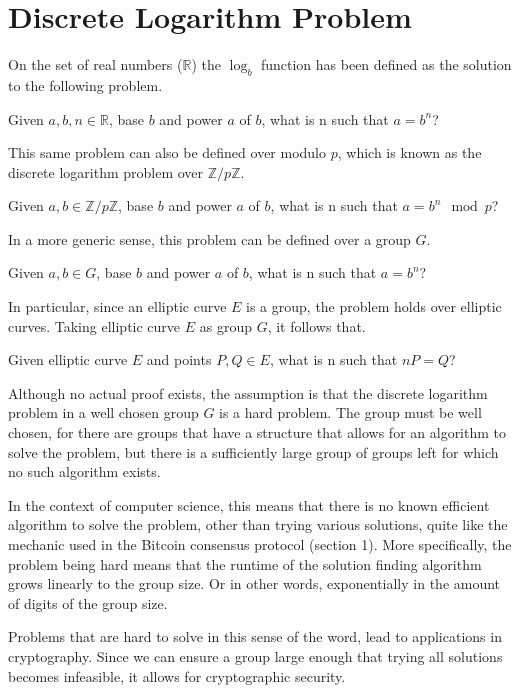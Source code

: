 \section{Discrete Logarithm Problem}
On the set of real numbers ($\mathbb{R}$) the $\log_b$ function has been defined as the solution to the following problem.
\begin{defn}
	Given $a,b,n\in\mathbb{R}$, base $b$ and power $a$ of $b$, what is n such that $a=b^n$?
\end{defn}
This same problem can also be defined over modulo $p$, which is known as the discrete logarithm problem over $\mathbb{Z}/p\mathbb{Z}$.
\begin{defn}
	Given $a,b\in\mathbb{Z}/p\mathbb{Z}$, base $b$ and power $a$ of $b$, what is n such that $a=b^n\mod{p}$?
\end{defn}
In a more generic sense, this problem can be defined over a group $G$.
\begin{defn}
	Given $a,b\in G$, base $b$ and power $a$ of $b$, what is n such that $a=b^n$?
\end{defn}
In particular, since an elliptic curve $E$ is a group, the problem holds over elliptic curves. Taking elliptic curve $E$ as group $G$, it follows that.
\begin{defn}
	Given elliptic curve $E$ and points $P,Q\in E$, what is n such that $nP=Q$?
\end{defn}
Although no actual proof exists, the assumption is that the discrete logarithm problem in a well chosen group $G$ is a hard problem. The group must be well chosen, for there are groups that have a structure that allows for an algorithm to solve the problem, but there is a sufficiently large group of groups left for which no such algorithm exists.

In the context of computer science, this means that there is no known efficient algorithm to solve the problem, other than trying various solutions, quite like the mechanic used in the Bitcoin consensus protocol (section 1). More specifically, the problem being hard means that the runtime of the solution finding algorithm grows linearly to the group size. Or in other words, exponentially in the amount of digits of the group size.

Problems that are hard to solve in this sense of the word, lead to applications in cryptography. Since we can ensure a group large enough that trying all solutions becomes infeasible, it allows for cryptographic security.

